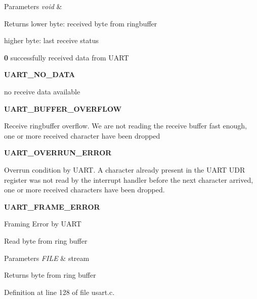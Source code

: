 \begin{DoxyParams}{Parameters}
{\em void} & \\
\hline
\end{DoxyParams}
\begin{DoxyReturn}{Returns}
lower byte\-: received byte from ringbuffer 

higher byte\-: last receive status
\begin{DoxyItemize}
\item {\bfseries 0} successfully received data from U\-A\-R\-T
\item {\bfseries U\-A\-R\-T\-\_\-\-N\-O\-\_\-\-D\-A\-T\-A} \par
no receive data available
\item {\bfseries U\-A\-R\-T\-\_\-\-B\-U\-F\-F\-E\-R\-\_\-\-O\-V\-E\-R\-F\-L\-O\-W} \par
Receive ringbuffer overflow. We are not reading the receive buffer fast enough, one or more received character have been dropped
\item {\bfseries U\-A\-R\-T\-\_\-\-O\-V\-E\-R\-R\-U\-N\-\_\-\-E\-R\-R\-O\-R} \par
Overrun condition by U\-A\-R\-T. A character already present in the U\-A\-R\-T U\-D\-R register was not read by the interrupt handler before the next character arrived, one or more received characters have been dropped.
\item {\bfseries U\-A\-R\-T\-\_\-\-F\-R\-A\-M\-E\-\_\-\-E\-R\-R\-O\-R} \par
Framing Error by U\-A\-R\-T
\end{DoxyItemize}
\end{DoxyReturn}
Read byte from ring buffer 
\begin{DoxyParams}{Parameters}
{\em F\-I\-L\-E} & stream \\
\hline
\end{DoxyParams}
\begin{DoxyReturn}{Returns}
byte from ring buffer 
\end{DoxyReturn}


Definition at line 128 of file usart.\-c.


